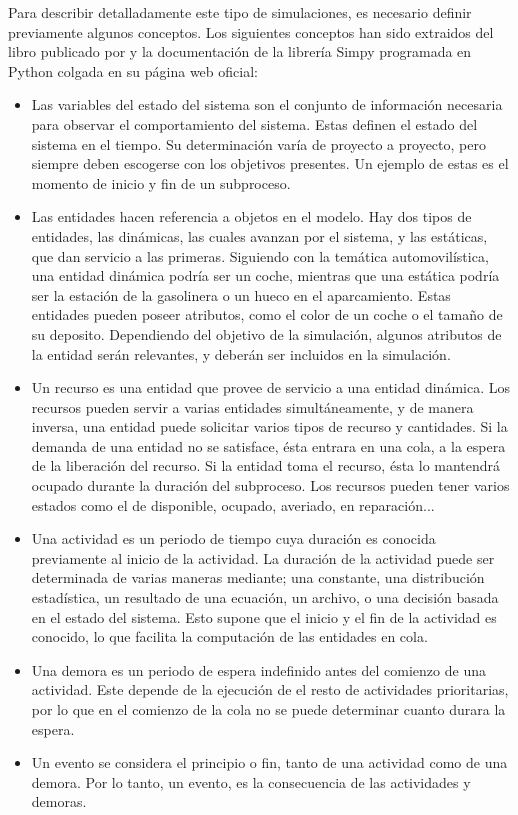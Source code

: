 Para describir detalladamente este tipo de simulaciones, es necesario definir previamente algunos conceptos. Los siguientes conceptos han sido extraidos del libro publicado por \citep{banks1998handbook} y la documentación de la librería Simpy programada en Python colgada en su página web oficial:

\begin{itemize}
\item Las variables del estado del sistema son el conjunto de información necesaria para observar el comportamiento del sistema. Estas definen el estado del sistema en el tiempo. Su determinación varía de proyecto a proyecto, pero siempre deben escogerse con los objetivos presentes. Un ejemplo de estas es el momento de inicio y fin de un subproceso.
\item Las entidades hacen referencia a objetos en el modelo. Hay dos tipos de entidades, las dinámicas, las cuales avanzan por el sistema, y las estáticas, que dan servicio a las primeras. Siguiendo con la temática automovilística, una entidad dinámica podría ser un coche, mientras que una estática podría ser la estación de la gasolinera o un hueco en el aparcamiento. Estas entidades pueden poseer atributos, como el color de un coche o el tamaño de su deposito. Dependiendo del objetivo de la simulación, algunos atributos de la entidad serán relevantes, y deberán ser incluidos en la simulación.
\item Un recurso es una entidad que provee de servicio a una entidad dinámica. Los recursos pueden servir a varias entidades simultáneamente, y de manera inversa, una entidad puede solicitar varios tipos de recurso y cantidades. Si la demanda de una entidad no se satisface, ésta entrara en una cola, a la espera de la liberación del recurso. Si la entidad toma el recurso, ésta lo mantendrá ocupado durante la duración del subproceso. Los recursos pueden tener varios estados como el de disponible, ocupado, averiado, en reparación...
\item Una actividad es un periodo de tiempo cuya duración es conocida  previamente al inicio de la actividad. La duración de la actividad puede ser determinada de varias maneras mediante; una constante, una distribución estadística, un resultado de una ecuación, un archivo, o una decisión basada en el estado del sistema. Esto supone que el inicio y el fin de la actividad es conocido, lo que facilita la computación de las entidades en cola.
\item Una demora es un periodo de espera indefinido antes del comienzo de una actividad. Este depende de la ejecución de el resto de actividades prioritarias, por lo que en el comienzo de la cola no se puede determinar cuanto durara la espera.
\item Un evento se considera el principio o fin, tanto de una actividad como de una demora. Por lo tanto, un evento, es la consecuencia de las actividades y demoras.
\end{itemize}

